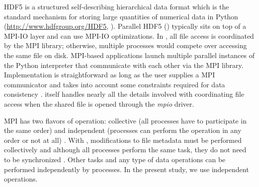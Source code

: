 HDF5 is a structured self-describing hierarchical data format which is the standard mechanism for storing large quantities of numerical data in Python (\url{http://www.hdfgroup.org/HDF5}, \cite{pythonhdf5}).
Parallel HDF5 () typically sits on top of a MPI-IO layer and can use MPI-IO optimizations. 
In , all file access is coordinated by the MPI library; otherwise, multiple processes would compete over accessing the same file on disk. 
MPI-based applications launch multiple parallel instances of the Python interpreter that communicate with each other via the MPI library. 
Implementation is straightforward as long as the user supplies a MPI communicator and takes into account some constraints required for data consistency \cite{pythonhdf5}.
 itself handles nearly all the details involved with coordinating file access when the shared file is opened through the \emph{mpio} driver.

MPI has two flavors of operation: collective (all processes have to participate in the same order) and independent (processes can perform the operation in any order or not at all) \cite{pythonhdf5}.
With , modifications to file metadata must be performed collectively and although all processes perform the same task, they do not need to be synchronized \cite{pythonhdf5}. 
Other tasks and any type of data operations can be performed independently by processes.
In the present study, we use independent operations.


